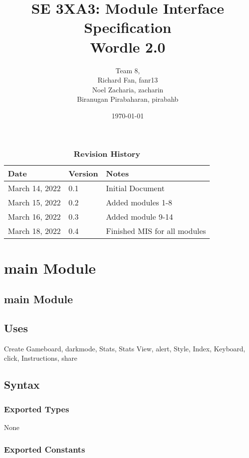 \documentclass[12pt]{article}
\title{SE 3XA3: Module Interface Specification\\ Wordle 2.0}
\author{Team 8,
	\\ Richard Fan, fanr13
	\\ Noel Zacharia, zacharin
	\\ Biranugan Pirabaharan, pirabahb
}
\date{\today}
\begin{document}
 
\maketitle
\newpage
\tableofcontents
\listoftables
\listoffigures

\newpage
\begin{table}[h]
\caption{\bf Revision History}
\begin{tabularx}{\textwidth}{p{3cm}p{2cm}X}
\toprule {\bf Date} & {\bf Version} & {\bf Notes}\\
\midrule
March 14, 2022 & 0.1 & Initial Document\\
March 15, 2022 & 0.2 & Added modules 1-8\\
March 16, 2022 & 0.3 & Added module 9-14\\
March 18, 2022 & 0.4 & Finished MIS for all modules\\
\bottomrule
\end{tabularx}
\end{table}

\newpage

\section {main Module}

\subsection* {main Module}

\subsection* {Uses}

Create Gameboard, darkmode, Stats, Stats View, alert, Style, Index, Keyboard, click, Instructions, share

\subsection* {Syntax}

\subsubsection* {Exported Types}

None

\subsubsection* {Exported Constants}
\end{document}
